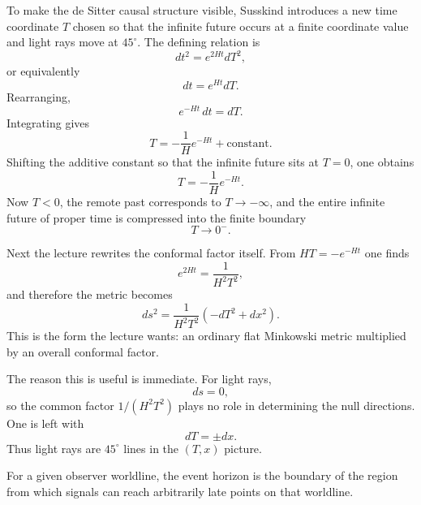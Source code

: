 To make the de Sitter causal structure visible, Susskind introduces a new time coordinate \(T\) chosen so that the infinite future occurs at a finite coordinate value and light rays move at \(45^\circ\). The defining relation is
\begin{equation}
dt^2=e^{2Ht}dT^2,
\end{equation}
or equivalently
\begin{equation}
dt=e^{Ht}dT.
\end{equation}
Rearranging,
\begin{equation}
e^{-Ht}\,dt=dT.
\end{equation}
Integrating gives
\begin{equation}
T=-\frac{1}{H}e^{-Ht}+\text{constant}.
\end{equation}
Shifting the additive constant so that the infinite future sits at \(T=0\), one obtains
\begin{equation}
T=-\frac{1}{H}e^{-Ht}.
\end{equation}
Now \(T<0\), the remote past corresponds to \(T\to -\infty\), and the entire infinite future of proper time is compressed into the finite boundary
\begin{equation}
T\to 0^-.
\end{equation}

Next the lecture rewrites the conformal factor itself. From \(HT=-e^{-Ht}\) one finds
\begin{equation}
e^{2Ht}=\frac{1}{H^2T^2},
\end{equation}
and therefore the metric becomes
\begin{equation}
ds^2=\frac{1}{H^2T^2}\left(-dT^2+dx^2\right).
\end{equation}
This is the form the lecture wants: an ordinary flat Minkowski metric multiplied by an overall conformal factor.

The reason this is useful is immediate. For light rays,
\begin{equation}
ds=0,
\end{equation}
so the common factor \(1/(H^2T^2)\) plays no role in determining the null directions. One is left with
\begin{equation}
dT=\pm dx.
\end{equation}
Thus light rays are \(45^\circ\) lines in the \((T,x)\) picture.

\begin{definition}
For a given observer worldline, the event horizon is the boundary of the region from which signals can reach arbitrarily late points on that worldline.
\end{definition}

